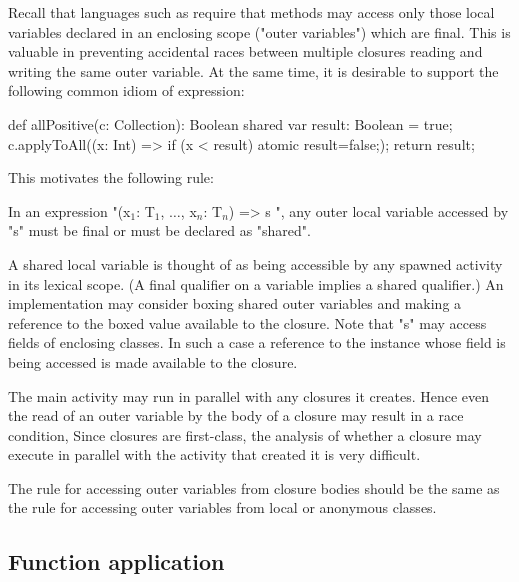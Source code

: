 Recall that languages such as \java{} require that methods may
access only those local variables declared in an enclosing scope
("outer variables") which are final. This is valuable in
preventing accidental races between multiple closures reading
and writing the same outer variable. At the same time, it is
desirable to support the following common idiom of expression:

\begin{xten}
def allPositive(c: Collection): Boolean {
  shared var result: Boolean = true;
  c.applyToAll((x: Int) => { if (x < result) atomic {result=false;}});
  return result;
}
\end{xten}

This motivates the following rule:

\begin{staticrule*}
In an expression
\xcdmath"(x$_1$: T$_1$, $\dots$, x$_n$: T$_n$) => { s }",
any outer local variable accessed by \xcd"s" must be final or
must be declared
as \xcd"shared".
\end{staticrule*}

A shared local variable is thought of as being accessible by any spawned
activity in its lexical scope. (A final qualifier on a variable implies
a shared qualifier.) An implementation may consider boxing shared outer
variables and making a reference to the boxed value available to the
closure. Note that \xcd"s" may access fields of enclosing classes. In such a
case a reference to the instance whose field is being accessed is made
available to the closure.

\begin{note}
The main activity may run in parallel with any
closures it creates. Hence even the read of an outer variable by the
body of a closure may result in a race condition, Since closures are
first-class, the analysis of whether a closure may execute in parallel
with the activity that created it is very difficult.
\end{note}

\begin{note}
The rule for accessing outer variables from closure bodies
should be the same as the rule for accessing outer variables from local
or anonymous classes.
\end{note}

\subsection{Function application}

